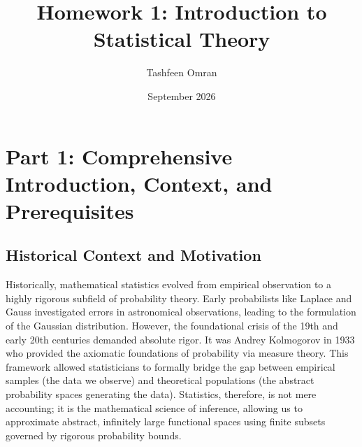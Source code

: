 \documentclass[11pt]{article}
\title{\textbf{Homework 1: Introduction to Statistical Theory}}
\author{Tashfeen Omran}
\date{September 2026}
\theoremstyle{definition}
\theoremstyle{remark}
\begin{document}
\maketitle
\tableofcontents
\newpage

\section{Part 1: Comprehensive Introduction, Context, and Prerequisites}

\subsection{Historical Context and Motivation}
Historically, mathematical statistics evolved from empirical observation to a highly rigorous subfield of probability theory. Early probabilists like Laplace and Gauss investigated errors in astronomical observations, leading to the formulation of the Gaussian distribution. However, the foundational crisis of the 19th and early 20th centuries demanded absolute rigor. It was Andrey Kolmogorov in 1933 who provided the axiomatic foundations of probability via measure theory. This framework allowed statisticians to formally bridge the gap between empirical samples (the data we observe) and theoretical populations (the abstract probability spaces generating the data). Statistics, therefore, is not mere accounting; it is the mathematical science of inference, allowing us to approximate abstract, infinitely large functional spaces using finite subsets governed by rigorous probability bounds.
\end{document}
